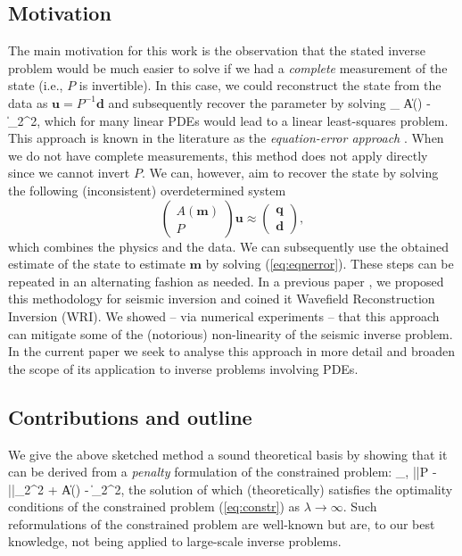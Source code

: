 \documentclass{iopart}
\begin{document}
{\subsection{Motivation}
The main motivation for this work is the observation that the stated inverse problem would be much easier to solve if we had a \emph{complete} measurement of the state (i.e., $P$ is invertible). In this case, we could reconstruct the state from the data as $\mathbf{u} = P^{-1}\mathbf{d}$ and subsequently recover the parameter by solving
\bq
\label{eq:eqnerror}
\min_{} \|A() - \|_2^2,
\eq
which for many linear PDEs would lead to a linear least-squares problem. This approach is known in the literature as the \emph{equation-error approach} \cite{Richter1981,Banerjee2013}. When we do not have complete measurements, this method does not apply directly since we cannot invert $P$. We can, however, aim to recover the state by solving the following (inconsistent) overdetermined system
\[
\left(\begin{array}{c}
A(\mathbf{m})\\
P
\end{array}\right)\mathbf{u}\approx
\left(\begin{array}{c}
\mathbf{q}\\
\mathbf{d}
\end{array}\right),
\] 
which combines the physics and the data. We can subsequently use the obtained estimate of the state to estimate $\mathbf{m}$ by solving (\ref{eq:eqnerror}). These steps can be repeated in an alternating fashion as needed. In a previous paper \cite{vanLeeuwen2013Penalty1}, we proposed this methodology for seismic inversion and coined it Wavefield Reconstruction Inversion (WRI). We showed -- via numerical experiments -- that this approach can mitigate some of the (notorious) non-linearity of the seismic inverse problem. In the current paper we seek to analyse this approach in more detail and broaden the scope of its application to inverse problems involving PDEs.

\subsection{Contributions and outline}
We give the above sketched method a sound theoretical basis by showing that it can be derived from a \emph{penalty} formulation of the constrained problem:
\bq
\label{eq:pen}
\min_{,} ||P - ||_2^2 + \|A() - \|_2^2,
\eq
the solution of which (theoretically) satisfies the optimality conditions of the constrained problem (\ref{eq:constr}) as $\lambda\rightarrow\infty$.
Such reformulations of the constrained problem are well-known but are, to our best knowledge, not being applied to large-scale inverse problems. 

}
\end{document}
